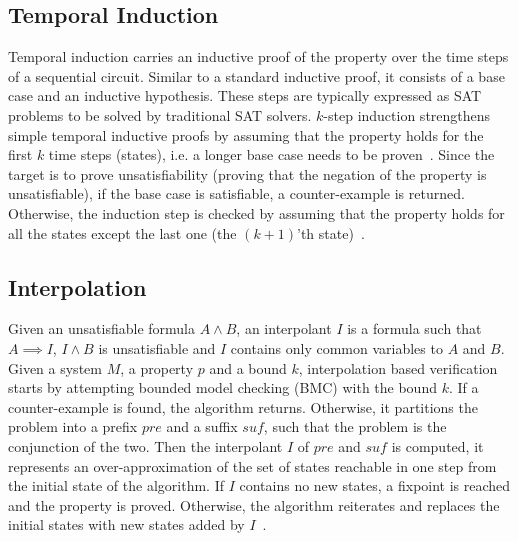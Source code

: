\subsection{Temporal Induction}
Temporal induction carries an inductive proof of the property 
over the time steps of a sequential circuit.
Similar to a standard inductive proof, it consists of a base
case and an inductive hypothesis. These steps are typically 
expressed as SAT problems to be solved by traditional SAT solvers.  
$k$-step induction strengthens simple temporal inductive proofs 
by assuming that the property holds for the first $k$ time steps (states), 
i.e. a longer base case needs to be proven~\cite{een2003temporal}. Since the target is
to prove unsatisfiability (proving that the negation of the property 
is unsatisfiable), if the base case is satisfiable, a counter-example 
is returned. Otherwise, the induction step is checked by assuming that
the property holds for all the states except the last one (the $(k+1)$'th 
state)~\cite{biere2009handbook}.   

\subsection{Interpolation}
Given an unsatisfiable formula $A \land B$, an interpolant $I$ is
a formula such that $A \implies I$, $I \land B$ is unsatisfiable and
$I$ contains only common variables to $A$ and $B$. 
Given a system $M$, a property $p$ and a bound $k$, interpolation
based verification starts by attempting bounded model checking (BMC) with the bound $k$. 
If a counter-example is found, the algorithm returns. Otherwise, it
partitions the problem into a prefix $pre$ and a suffix $suf$, such that the 
problem is the conjunction of the two. 
Then the interpolant $I$ of $pre$ and $suf$ is computed, it represents
an over-approximation of the set of states reachable in one step from the initial state
of the algorithm. If $I$ contains no new states, a fixpoint is reached 
and the property is proved. Otherwise, the algorithm reiterates and replaces
the initial states with new states added by $I$~\cite{amla2005analysis}. 


